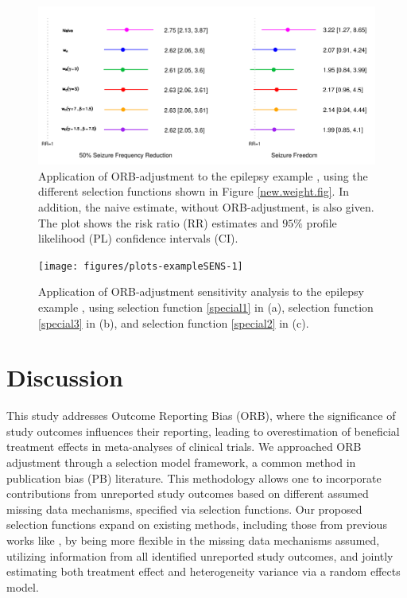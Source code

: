 \documentclass[twocolumn]{article}\usepackage[]{graphicx}\usepackage[]{xcolor}
\makeatletter
\def\maxwidth{ %
  \ifdim\Gin@nat@width>\linewidth
    \linewidth
  \else
    \Gin@nat@width
  \fi
}
\makeatother
\begin{document}
\begin{figure}[!hbt]
\centering
\caption{Application of ORB-adjustment to the epilepsy example \citep{Copas2019, topiramate}, using the different selection functions shown in Figure \ref{new.weight.fig}. In addition, the naive estimate, without ORB-adjustment, is also given. The plot shows the risk ratio (RR) estimates and $95\%$ profile likelihood (PL) confidence intervals (CI).}


{\centering \includegraphics[width=\maxwidth]{figures/plots-example-1} 

}



\label{example}
\end{figure}


\begin{figure}[!hbt]
\centering
\caption{Application of ORB-adjustment sensitivity analysis to the epilepsy example \citep{Copas2019, topiramate}, using selection function \eqref{special1} in (a), selection function \eqref{special3} in (b), and selection function \eqref{special2} in (c).\\[0.5mm]}


{\centering \texttt{[image: figures/plots-exampleSENS-1]} 

}



\label{exampleSENS}
\end{figure}

\section{Discussion} \label{disc}

This study addresses Outcome Reporting Bias (ORB), where the significance of study outcomes influences their reporting, leading to overestimation of beneficial treatment effects in meta-analyses of clinical trials. We approached ORB adjustment through a selection model framework, a common method in publication bias (PB) literature. This methodology allows one to incorporate contributions from unreported study outcomes based on different assumed missing data mechanisms, specified via selection functions. Our proposed selection functions expand on existing methods, including those from previous works like \citet{Copas2019}, by being more flexible in the missing data mechanisms assumed, utilizing information from all identified unreported study outcomes, and jointly estimating both treatment effect and heterogeneity variance via a random effects model.
\end{document}
